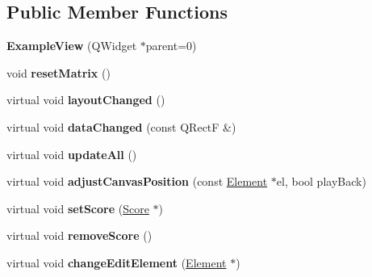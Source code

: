 \subsection*{Public Member Functions}
\begin{DoxyCompactItemize}
\item 
\mbox{\label{class_ms_1_1_example_view_aef93b941d33345bd6f166f7b14c4d4db}} 
{\bfseries Example\+View} (Q\+Widget $\ast$parent=0)
\item 
\mbox{\label{class_ms_1_1_example_view_a526397b9a151f8d1bb49525144c7c144}} 
void {\bfseries reset\+Matrix} ()
\item 
\mbox{\label{class_ms_1_1_example_view_a5931ce5714dce9431eb511ac586df55f}} 
virtual void {\bfseries layout\+Changed} ()
\item 
\mbox{\label{class_ms_1_1_example_view_a8d132a367d636b1759618e341085bb7f}} 
virtual void {\bfseries data\+Changed} (const Q\+RectF \&)
\item 
\mbox{\label{class_ms_1_1_example_view_a057c9be38059d1f751bbf919c1753bd3}} 
virtual void {\bfseries update\+All} ()
\item 
\mbox{\label{class_ms_1_1_example_view_afbf71717a55906151b1733e2756dbbce}} 
virtual void {\bfseries adjust\+Canvas\+Position} (const \hyperlink{class_ms_1_1_element}{Element} $\ast$el, bool play\+Back)
\item 
\mbox{\label{class_ms_1_1_example_view_ad3139964f857b37c5e443561a0fb5d89}} 
virtual void {\bfseries set\+Score} (\hyperlink{class_ms_1_1_score}{Score} $\ast$)
\item 
\mbox{\label{class_ms_1_1_example_view_acb85573ac6533a1321f85e2a32476cbd}} 
virtual void {\bfseries remove\+Score} ()
\item 
\mbox{\label{class_ms_1_1_example_view_a551cd78e76e5e88673ae51fa0dc52772}} 
virtual void {\bfseries change\+Edit\+Element} (\hyperlink{class_ms_1_1_element}{Element} $\ast$)

\end{DoxyCompactItemize}
